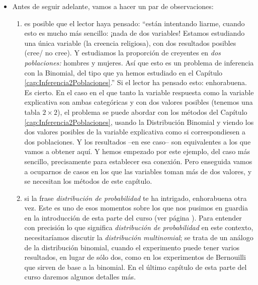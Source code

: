 \begin{itemize}
    \item Antes de seguir adelante, vamos a hacer un par de observaciones:
        \begin{enumerate}
            \item es posible que el lector haya pensado: ``están intentando liarme, cuando esto es mucho más sencillo: ¡nada de dos variables! Estamos estudiando una única variable (la creencia religiosa), con dos resultados posibles (cree/ no cree). Y estudiamos la proporción de creyentes en {\em dos poblaciones:} hombres y mujeres. Así que esto es un problema de inferencia con la Binomial, del tipo que ya hemos estudiado en el Capítulo \ref{cap:Inferencia2Poblaciones}.'' Si el lector ha pensado esto: enhorabuena. Es cierto. En el caso en el que tanto la variable respuesta como la variable explicativa son ambas categóricas y con dos valores posibles (tenemos una tabla $2\times 2$), el problema se puede abordar con los métodos del Capítulo \ref{cap:Inferencia2Poblaciones}, usando la Distribución Binomial y viendo los dos valores posibles de la variable explicativa como si correspondiesen a dos poblaciones. Y los resultados --en ese caso-- son equivalentes a los que vamos a obtener aquí. Y hemos empezado por este ejemplo, del caso más sencillo, precisamente para establecer esa conexión. Pero enseguida vamos a ocuparnos de casos en los que las variables toman más de dos valores, y se necesitan los métodos de este capítulo.

            \item si la frase {\em distribución de probabilidad} te ha intrigado, enhorabuena otra vez. Este es uno de esos momentos sobre los que nos pusimos en guardia en la introducción de esta parte del curso (ver página \pageref{part04:intro}). Para entender con precisión lo que significa {\em distribución de probabilidad} en este contexto, necesitaríamos discutir la {\em distribución multinomial}; se trata de un análogo de la distribución binomial, cuando el experimento puede tener varios resultados, en lugar de sólo dos, como en los experimentos de Bernouilli que sirven de base a la binomial. En el último capítulo de esta parte del curso daremos algunos detalles más.

        \end{enumerate}



\end{itemize}

